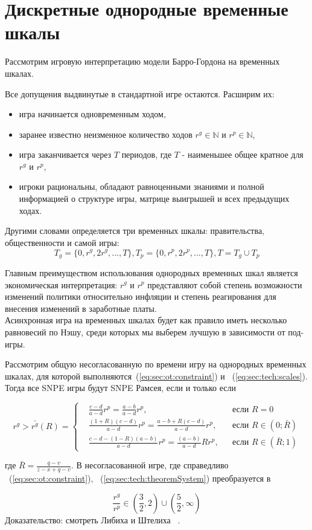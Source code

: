
\section{Дискретные однородные временные шкалы} 

Рассмотрим игровую интерпретацию модели Барро-Гордона на временных шкалах.

Все допущения выдвинутые в стандартной игре остаются. Расширим их:
\begin{itemize}
\item игра начинается одновременным ходом, 
\item заранее известно неизменное количество ходов $r^g \in \mathbb{N}$ и $r^p \in \mathbb{N}$,
\item игра заканчивается через $T$ периодов, где $T$ - наименьшее общее кратное для $r^g$ и $r^p$,
\item игроки рациональны, обладают равноценными знаниями и полной информацией о структуре игры, матрице выигрышей и всех предыдущих ходах.
 \end{itemize}

Другими словами определяется три временных шкалы: правительства, общественности и самой игры:
\begin{equation}
\label{eq:sec:tech:scales}
T_g = \{0,r^g,2r^g,...,T\}, T_p=\{0,r^p,2r^p,...,T\}, T=T_g\cup T_p 
\end{equation}

Главным преимуществом использования однородных временных шкал является экономическая интерпретация: $r^g$ и $r^p$ представляют собой степень возможности изменений политики относительно инфляции и степень реагирования для внесения изменений в заработные платы.
\\

Асинхронная игра на временных шкалах будет как правило иметь несколько равновесий по Нэшу, среди которых мы выберем лучшую в зависимости от под-игры.

\begin{theorem}
	Рассмотрим общую несогласованную по времени игру на однородных временных шкалах, для которой выполняются~(\ref{eq:sec:ot:constraint}) и ~(\ref{eq:sec:tech:scales}). Тогда все SNPE игры будут SNPE Рамсея, если и только если
	
	\begin{equation}
		\label{eq:sec:tech:theoremSystem}
		r^g> \bar{r^g}(R) = \left\{ 
		\begin{aligned} 
			&\frac{c - d}{a-d}r^p= \frac{a-b}{a-d}r^p, &&\text{если } R=0
			\\
			&\frac{(1+R)(c-d)}{a-d}r^p= \frac{a-b + R(c-d)}{a-d}r^p, &&\text{если } 	R\in(0; \bar{R})
			\\
			&\frac{c-d-(1-R)(a-b)}{a-d}r^p= \frac{(a-b)}{a-d}Rr^p, &&\text{если } 	R\in(\bar{R};1)
		\end{aligned}
		\right.		
	\end{equation}
\end{theorem}
где $\bar{R}=\frac{q-v}{z-x+q-v}$. В несогласованной игре, где справедливо ~(\ref{eq:sec:ot:constraint}),  ~(\ref{eq:sec:tech:theoremSystem}) преобразуется в 

\begin{equation}
	\frac{r^g}{r^p} \in \left(\frac{3}{2}, 2\right)\cup \left(\frac{5}{2}, \infty\right)
\end{equation}
Доказательство: смотреть Либиха и Штелиха ~\cite{libichIncorpo}.